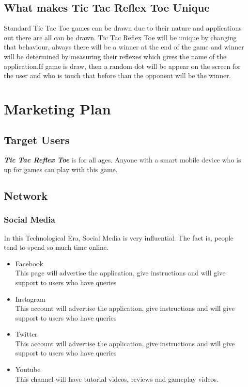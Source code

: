 \documentclass{article}
\begin{document}
    \subsection{What makes Tic Tac Reflex Toe Unique}
    Standard Tic Tac Toe games can be drawn due to their nature and applications out there are all can be drawn. Tic Tac Reflex Toe will be unique by changing that behaviour, always there will be a winner at the end of the game and winner will be determined by measuring their reflexes which gives the name of the application.If game is draw, then a random dot will be appear on the screen for the user and who is touch that before than the opponent will be the winner.

\newpage
\section{Marketing Plan}
\subsection{Target Users}
    \textbf{\emph{Tic Tac Reflex Toe}} is for all ages.  Anyone with a smart mobile device who is up for games can play with this game.
\subsection{Network}
    \subsubsection{Social Media}
        In this Technological Era, Social Media is very influential.  The fact is, people tend to spend so much time online.  
        \newline
        \begin{itemize}
        	\item Facebook\\This page will advertise the application, give instructions and will give support to users who have queries
        	\item Instagram\\This account will advertise the application, give instructions and will give support to users who have queries
        	\item Twitter\\This account will advertise the application, give instructions and will give support to users who have queries
        	\item Youtube\\This channel will have tutorial videos, reviews and gameplay videos.
        \end{itemize}
    
\end{document}
